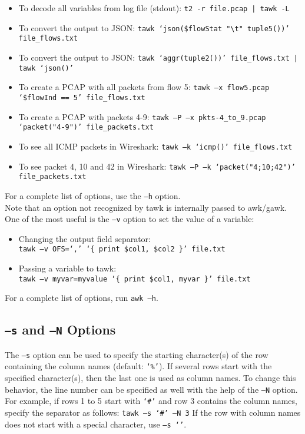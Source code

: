 \documentclass[documentation]{subfiles}
\begin{document}
\begin{itemize}
    \item To decode all variables from  log file (stdout): {\tt t2 -r file.pcap | tawk -L}
    \item To convert the output to JSON: {\tt tawk `json(\$flowStat "\textbackslash{}t" tuple5())' file\_flows.txt}
    \item To convert the output to JSON: {\tt tawk `aggr(tuple2())' file\_flows.txt | tawk `json()'}
    \item To create a PCAP with all packets from flow 5: {\tt tawk --x flow5.pcap `\$flowInd == 5' file\_flows.txt}
    \item To create a PCAP with packets 4-9: {\tt tawk --P --x pkts-4\_to\_9.pcap `packet("4-9")' file\_packets.txt}
    \item To see all ICMP packets in Wireshark: {\tt tawk --k `icmp()' file\_flows.txt}
    \item To see packet 4, 10 and 42 in Wireshark: {\tt tawk --P --k `packet("4;10;42")' file\_packets.txt}
\end{itemize}
For a complete list of options, use the {\tt --h} option.\\

Note that an option not recognized by tawk is internally passed to awk/gawk.
One of the most useful is the {\tt --v} option to set the value of a variable:
\begin{itemize}
    \item Changing the output field separator:\\
          {\tt tawk --v OFS=`,' `\{ print \$col1, \$col2 \}' file.txt}
    \item Passing a variable to tawk:\\
          {\tt tawk --v myvar=myvalue `\{ print \$col1, myvar \}' file.txt}
\end{itemize}
For a complete list of options, run {\tt awk --h}.


\subsection{{\tt --s} and {\tt --N} Options}\label{tawk-s-option}
The {\tt --s} option can be used to specify the starting character(s) of the row containing the column names (default: {\tt `\%'}).
If several rows start with the specified character(s), then the last one is used as column names.
To change this behavior, the line number can be specified as well with the help of the {\tt --N} option.
For example, if rows 1 to 5 start with {\tt `\#'} and row 3 contains the column names, specify the separator as follows: {\tt tawk --s `\#' --N 3}
If the row with column names does not start with a special character, use {\tt --s `'}.
\end{document}
